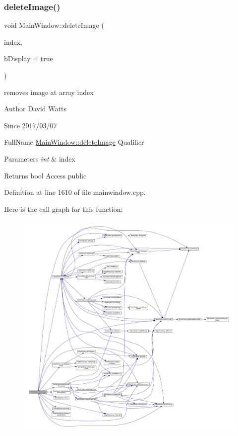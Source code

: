 \subsubsection{\texorpdfstring{delete\+Image()}{deleteImage()}}
{\footnotesize\ttfamily void Main\+Window\+::delete\+Image (\begin{DoxyParamCaption}\item[{int}]{index,  }\item[{bool}]{b\+Display = {\ttfamily true} }\end{DoxyParamCaption})}

removes image at array index

\begin{DoxyAuthor}{Author}
David Watts 
\end{DoxyAuthor}
\begin{DoxySince}{Since}
2017/03/07
\end{DoxySince}
Full\+Name \hyperlink{class_main_window_ad0219fc878a0bc02403d00a16b7fc7ec}{Main\+Window\+::delete\+Image} Qualifier 
\begin{DoxyParams}{Parameters}
{\em int} & index \\
\hline
\end{DoxyParams}
\begin{DoxyReturn}{Returns}
bool Access public 
\end{DoxyReturn}


Definition at line 1610 of file mainwindow.\+cpp.

Here is the call graph for this function\+:
\nopagebreak
\begin{figure}[H]
\begin{center}
\leavevmode
\includegraphics[width=350pt]{class_main_window_ad0219fc878a0bc02403d00a16b7fc7ec_cgraph}
\end{center}
\end{figure}
\mbox{\label{class_main_window_a8e20e1254b179ca9ec054ec908d9cc43}} 

